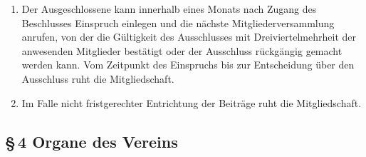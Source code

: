 \documentclass[12pt,a4paper]{article}
\begin{document}
\begin{enumerate}
\begin{enumerate}
\item Der Ausgeschlossene kann innerhalb eines Monats nach Zugang des Beschlusses Einspruch einlegen und die nächste Mitgliederversammlung anrufen, von der die Gültigkeit des Ausschlusses mit Dreiviertelmehrheit der anwesenden Mitglieder bestätigt oder der Ausschluss rückgängig gemacht werden kann. Vom Zeitpunkt des Einspruchs bis zur Entscheidung über den Ausschluss ruht die Mitgliedschaft.
\item Im Falle nicht fristgerechter Entrichtung der Beiträge ruht die Mitgliedschaft.
\end{enumerate}
\end{enumerate}

\subsection*{§\,4 Organe des Vereins}
\end{document}
